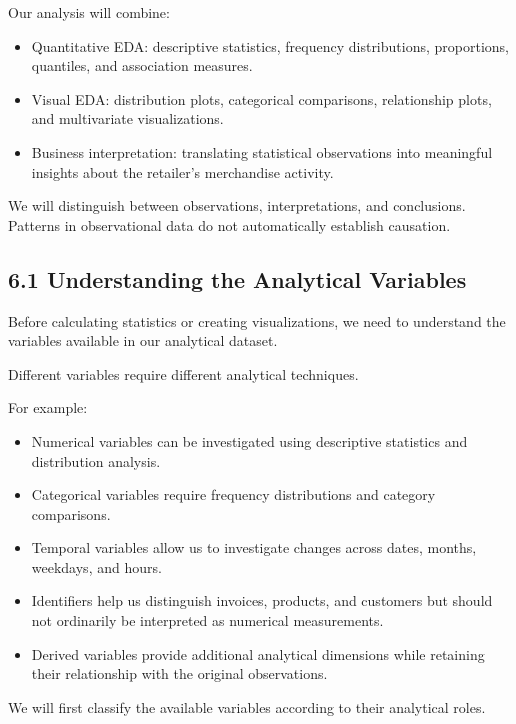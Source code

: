 \documentclass[11pt]{article}
\providecommand{\tightlist}{%
      \setlength{\itemsep}{0pt}\setlength{\parskip}{0pt}}
\begin{document}
Our analysis will combine:

\begin{itemize}
\tightlist
\item
  Quantitative EDA: descriptive statistics, frequency distributions,
  proportions, quantiles, and association measures.
\item
  Visual EDA: distribution plots, categorical comparisons, relationship
  plots, and multivariate visualizations.
\item
  Business interpretation: translating statistical observations into
  meaningful insights about the retailer's merchandise activity.
\end{itemize}

We will distinguish between observations, interpretations, and
conclusions. Patterns in observational data do not automatically
establish causation.

    \subsection{6.1 Understanding the Analytical
Variables}\label{understanding-the-analytical-variables}

Before calculating statistics or creating visualizations, we need to
understand the variables available in our analytical dataset.

Different variables require different analytical techniques.

For example:

\begin{itemize}
\tightlist
\item
  Numerical variables can be investigated using descriptive statistics
  and distribution analysis.
\item
  Categorical variables require frequency distributions and category
  comparisons.
\item
  Temporal variables allow us to investigate changes across dates,
  months, weekdays, and hours.
\item
  Identifiers help us distinguish invoices, products, and customers but
  should not ordinarily be interpreted as numerical measurements.
\item
  Derived variables provide additional analytical dimensions while
  retaining their relationship with the original observations.
\end{itemize}

We will first classify the available variables according to their
analytical roles.
\end{document}

